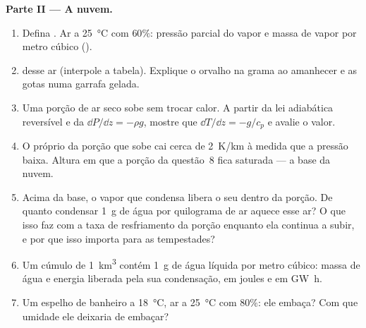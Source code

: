 \begin{problem}
\medskip
\noindent\textbf{Parte II --- A nuvem.}
\begin{enumerate}[resume]
  \item Defina . Ar a \qty{25}{\degreeCelsius} com $60\%$:
        pressão parcial do vapor e massa de vapor por metro cúbico
        ().
  \item {} desse ar (interpole a tabela). Explique o orvalho
        na grama ao amanhecer e as gotas numa garrafa gelada.
  \item Uma porção de ar seco sobe sem trocar calor. A partir da lei
        adiabática reversível e da 
        $\dd P/\dd z = -\rho g$, mostre que $\dd T/\dd z = -g/c_p$ e
        avalie o valor.
  \item O próprio  da porção que sobe cai cerca de
        \qty{2}{K/km} à medida que a pressão baixa. Altura em que a porção da
        questão~8 fica saturada --- a base da nuvem.
  \item Acima da base, o vapor que condensa libera o seu 
        dentro da porção. De quanto condensar \qty{1}{g} de
        água por quilograma de ar aquece esse ar? O que isso faz com a
        taxa de resfriamento da porção enquanto ela continua a subir, e por que
        isso importa para as tempestades?
  \item Um cúmulo de \qty{1}{km^3} contém \qty{1}{g} de água líquida por metro
        cúbico: massa de água e energia liberada pela sua
        condensação, em joules e em \unit{GW h}.
  \item Um espelho de banheiro a \qty{18}{\degreeCelsius}, ar a
        \qty{25}{\degreeCelsius} com $80\%$: ele embaça? Com que umidade
        ele deixaria de embaçar?
\end{enumerate}


\end{problem}
